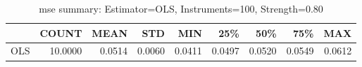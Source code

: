 \begin{table}[ht]
\centering
\caption{mse summary: Estimator=OLS, Instruments=100, Strength=0.80}
\begin{tabular}{lrrrrrrrr}
\toprule
 & COUNT & MEAN & STD & MIN & 25\% & 50\% & 75\% & MAX \\
\midrule
OLS & 10.0000 & 0.0514 & 0.0060 & 0.0411 & 0.0497 & 0.0520 & 0.0549 & 0.0612 \\
\bottomrule
\end{tabular}
\end{table}
